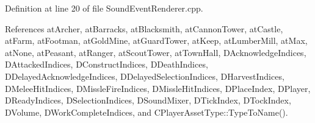 Definition at line 20 of file Sound\+Event\+Renderer.\+cpp.



References at\+Archer, at\+Barracks, at\+Blacksmith, at\+Cannon\+Tower, at\+Castle, at\+Farm, at\+Footman, at\+Gold\+Mine, at\+Guard\+Tower, at\+Keep, at\+Lumber\+Mill, at\+Max, at\+None, at\+Peasant, at\+Ranger, at\+Scout\+Tower, at\+Town\+Hall, D\+Acknowledge\+Indices, D\+Attacked\+Indices, D\+Construct\+Indices, D\+Death\+Indices, D\+Delayed\+Acknowledge\+Indices, D\+Delayed\+Selection\+Indices, D\+Harvest\+Indices, D\+Melee\+Hit\+Indices, D\+Missle\+Fire\+Indices, D\+Missle\+Hit\+Indices, D\+Place\+Index, D\+Player, D\+Ready\+Indices, D\+Selection\+Indices, D\+Sound\+Mixer, D\+Tick\+Index, D\+Tock\+Index, D\+Volume, D\+Work\+Complete\+Indices, and C\+Player\+Asset\+Type\+::\+Type\+To\+Name().


